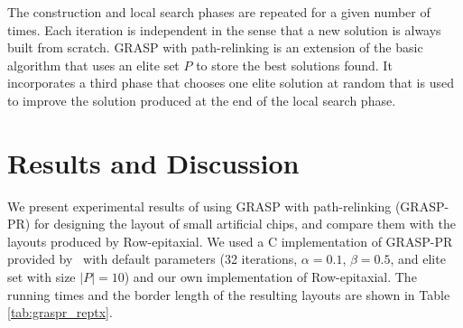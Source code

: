 \documentclass[english]{lni}
\newcommand{\ignore}[1]{}
\begin{document}
The construction and local search phases are repeated for a given number of
times. Each iteration is independent in the sense that a new solution is always built
from scratch. GRASP with path-relinking is an extension of the basic algorithm
that uses an elite set $P$ to store the best solutions found. It incorporates
a third phase that chooses one elite solution at random that is used
to improve the solution produced at the end of the local search phase.

\ignore{
Solutions $p$ and $q$ are combined as follows. For every location
$k = 1, \ldots, n$, the path-relinking algorithm attempts to exchange facility
$p_k$ assigned to location $k$ in  solution $p$ with facility $q_k$ assigned to
location $k$ in the elite solution. In order to keep the solution $p$ feasible,
it exchanges $p_k$ with $p_l$, where $p_l = q_k$. This exchange is
performed only if it results in a better solution. The result of the
path-relinking phase is a solution $r$ that is as good as $p$ and $q$.
For more details on GRASP with path-relinking, we refer to~\cite{OLIVEIRA04}.
}

\section{Results and Discussion}
\label{sec:results}

We present experimental results of using GRASP with path-relinking (GRASP-PR)
for designing the layout of small artificial chips, and compare them with the
layouts produced by Row-epitaxial. We used a C implementation of GRASP-PR provided
by~\cite{OLIVEIRA04} with default parameters (32 iterations, $\alpha=0.1$,
$\beta=0.5$, and elite set with size $|P|=10$) and our own implementation of
Row-epitaxial. The running times and the border length of the resulting layouts are
shown in Table \ref{tab:graspr_reptx}.

\ignore{
The main routine takes
three arguments: matrices $F$ and $D$ and the dimension of the problem~$n$ (in
our case, the number of spots or probes). We generated the matrices using the
formulations presented in Section \ref{sec:qap}.
}
\end{document}

